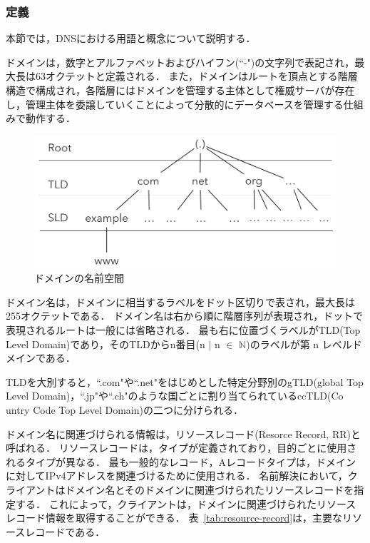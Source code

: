 \subsubsection{定義}
本節では，DNSにおける用語と概念について説明する．

ドメインは，数字とアルファベットおよびハイフン(``-")の文字列で表記され，最大長は63オクテットと定義される．
また，ドメインはルートを頂点とする階層構造で構成され，各階層にはドメインを管理する主体として権威サーバが存在し，管理主体を委譲していくことによって分散的にデータベースを管理する仕組みで動作する．

\begin{figure}[h]
 \centering
 \includegraphics[width=12.0cm]{figure/dns-architecture.png}
 \caption{ドメインの名前空間}
 \label{fig:dns-architecture}
\end{figure}

ドメイン名は，ドメインに相当するラベルをドット区切りで表され，最大長は255オクテットである．
ドメイン名は右から順に階層序列が表現され，ドットで表現されるルートは一般には省略される．
最も右に位置づくラベルがTLD(Top Level Domain)であり，そのTLDからn番目(n $\mid$ n $\in$ $\mathbb{N}$)のラベルが第 n レベルドメインである．

TLDを大別すると，``.com"や``.net"をはじめとした特定分野別のgTLD(global Top Level Domain)，``.jp"や``.ch"のような国ごとに割り当てられているccTLD(Co\\untry Code Top Level Domain)の二つに分けられる．



ドメイン名に関連づけられる情報は，リソースレコード(Resorce Record, RR)と呼ばれる．
リソースレコードは，タイプが定義されており，目的ごとに使用されるタイプが異なる．
最も一般的なレコード，Aレコードタイプは，ドメインに対してIPv4アドレスを関連づけるために使用される．
名前解決において，クライアントはドメイン名とそのドメインに関連づけられたリソースレコードを指定する．
これによって，クライアントは，ドメインに関連づけられたリソースレコード情報を取得することができる．
表~\ref{tab:resource-record}は，主要なリソースレコードである．


